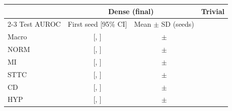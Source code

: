 \begin{tabular}{lccc}
\toprule
 & \multicolumn{2}{c}{Dense (final)} & Trivial \\
\cmidrule(lr){2-3}
Test AUROC & First seed [95\% CI] & Mean $\pm$ SD (seeds) & \\
\midrule
Macro & \denseFinalFirstTestMacroAuroc{} [\denseFinalFirstTestMacroAurocLo{}, \denseFinalFirstTestMacroAurocHi{}] & \denseFinalTestMacroAurocMean{} $\pm$ \denseFinalTestMacroAurocSd{} & \trivialTestMacroAuroc{} \\
\midrule
NORM & \denseFinalFirstTestAurocNORM{} [\denseFinalFirstTestAurocNORMLo{}, \denseFinalFirstTestAurocNORMHi{}] & \denseFinalTestAurocNORMMean{} $\pm$ \denseFinalTestAurocNORMSd{} & \trivialTestAurocNORM{} \\
MI & \denseFinalFirstTestAurocMI{} [\denseFinalFirstTestAurocMILo{}, \denseFinalFirstTestAurocMIHi{}] & \denseFinalTestAurocMIMean{} $\pm$ \denseFinalTestAurocMISd{} & \trivialTestAurocMI{} \\
STTC & \denseFinalFirstTestAurocSTTC{} [\denseFinalFirstTestAurocSTTCLo{}, \denseFinalFirstTestAurocSTTCHi{}] & \denseFinalTestAurocSTTCMean{} $\pm$ \denseFinalTestAurocSTTCSd{} & \trivialTestAurocSTTC{} \\
CD & \denseFinalFirstTestAurocCD{} [\denseFinalFirstTestAurocCDLo{}, \denseFinalFirstTestAurocCDHi{}] & \denseFinalTestAurocCDMean{} $\pm$ \denseFinalTestAurocCDSd{} & \trivialTestAurocCD{} \\
HYP & \denseFinalFirstTestAurocHYP{} [\denseFinalFirstTestAurocHYPLo{}, \denseFinalFirstTestAurocHYPHi{}] & \denseFinalTestAurocHYPMean{} $\pm$ \denseFinalTestAurocHYPSd{} & \trivialTestAurocHYP{} \\
\bottomrule
\end{tabular}
